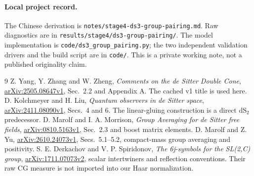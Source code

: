 \documentclass[11pt,a4paper]{article}
\begin{document}
\paragraph{Local project record.}
The Chinese derivation is \texttt{notes/stage4-ds3-group-pairing.md}.
Raw diagnostics are in \texttt{results/stage4/ds3-group-pairing/}.
The model implementation is \texttt{code/ds3\_group\_pairing.py};
the two independent validation drivers and the build script are in
\texttt{code/}. This is a private working note, not a published
originality claim.

\begin{thebibliography}{9}
Z. Yang, Y. Zhang and W. Zheng,
\emph{Comments on the de Sitter Double Cone},
\href{https://arxiv.org/html/2505.08647v1}{arXiv:2505.08647v1},
Sec.\ 2.2 and Appendix A. The cached v1 title is used here.
D. Kolchmeyer and H. Liu,
\emph{Quantum observers in de Sitter space},
\href{https://arxiv.org/html/2411.08090v1}{arXiv:2411.08090v1},
Secs.\ 4 and 6. The linear-gluing construction is a direct dS$_2$ predecessor.
D. Marolf and I. A. Morrison,
\emph{Group Averaging for de Sitter free fields},
\href{https://arxiv.org/html/0810.5163v1}{arXiv:0810.5163v1},
Sec.\ 2.3 and boost matrix elements.
D. Marolf and Z. Yu,
\href{https://arxiv.org/html/2610.24073v1}{arXiv:2610.24073v1},
Secs.\ 5.1--5.2, compact-mass group averaging and positivity.
S. E. Derkachov and V. P. Spiridonov,
\emph{The 6j-symbols for the SL(2,C) group},
\href{https://arxiv.org/html/1711.07073v2}{arXiv:1711.07073v2},
scalar intertwiners and reflection conventions.
Their raw CG measure is not imported into our Haar normalization.
\end{thebibliography}
\end{document}
